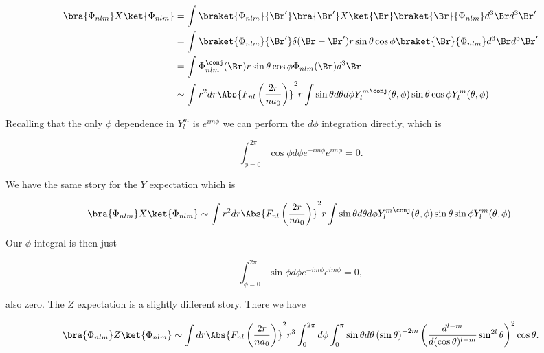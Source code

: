 \begin{align*}
\bra{\Phi_{nlm}} X \ket{\Phi_{nlm}} 
&=
\int 
\braket{\Phi_{nlm}}{\Br'} \bra{\Br'} X \ket{\Br} \braket{\Br}{\Phi_{nlm}} d^3 \Br d^3 \Br' \\
&=
\int 
\braket{\Phi_{nlm}}{\Br'} \delta(\Br - \Br') r \sin\theta \cos\phi \braket{\Br}{\Phi_{nlm}} d^3 \Br d^3 \Br' \\
&=
\int 
\Phi_{nlm}^\conj(\Br) r \sin\theta \cos\phi \Phi_{nlm}(\Br) d^3 \Br \\
&\sim
\int r^2 dr \Abs{ F_{nl}\left(\frac{2 r}{ n a_0} \right)}^2 r 
\int \sin\theta d\theta d\phi
{Y_l^m}^\conj(\theta, \phi) \sin\theta \cos\phi Y_l^m(\theta, \phi) \\
\end{align*}

Recalling that the only $\phi$ dependence in $Y_l^m$ is $e^{i m \phi}$ we can perform the $d\phi$ integration directly, which is

\begin{equation}\label{eqn:phy456ps1:740}
\int_{\phi=0}^{2\pi} \cos\phi d\phi e^{-i m \phi} e^{i m \phi} = 0.
\end{equation}

We have the same story for the $Y$ expectation which is

\begin{equation}\label{eqn:phy456ps1:760}
\bra{\Phi_{nlm}} X \ket{\Phi_{nlm}} 
\sim
\int r^2 dr \Abs{F_{nl}\left( \frac{2 r}{ n a_0} \right)}^2 r 
\int \sin\theta d\theta d\phi
{Y_l^m}^\conj(\theta, \phi) \sin\theta \sin\phi Y_l^m(\theta, \phi).
\end{equation}

Our $\phi$ integral is then just

\begin{equation}\label{eqn:phy456ps1:780}
\int_{\phi=0}^{2\pi} \sin\phi d\phi e^{-i m \phi} e^{i m \phi} = 0,
\end{equation}

also zero.  The $Z$ expectation is a slightly different story.  There we have

\begin{equation}\label{eqn:phy456ps1:800}
\bra{\Phi_{nlm}} Z \ket{\Phi_{nlm}} 
\sim
\int dr \Abs{F_{nl}\left( \frac{2 r}{ n a_0} \right)}^2 r^3 
\int_0^{2\pi} d\phi
\int_0^\pi \sin \theta d\theta
\left( \sin\theta \right)^{-2m}
\left( \frac{d^{l - m}}{d (\cos\theta)^{l-m}} \sin^{2l}\theta \right)^2
\cos\theta.
\end{equation}

